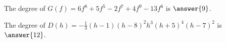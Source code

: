 \documentclass{ximera}
\begin{document}
\begin{exercise}
\begin{question}
\end{question}













\begin{question}


The degree of $G(f) = 6f^8 + 5f^5 - 2f^7 + 4f^9 - 13f^6$ is $\answer{9}$.

\end{question}




\begin{question}


The degree of $D(h) = -\frac{1}{3} (h - 1) (h - 8)^2 h^3 (h + 5)^4 (h - 7)^2$ is $\answer{12}$.

\end{question}















\end{exercise}
\end{document}

